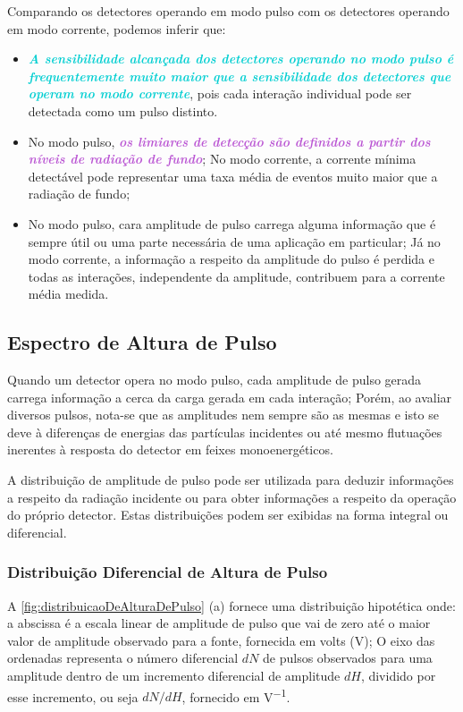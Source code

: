 \documentclass[11pt,a4paper]{article}
\begin{document}
			Comparando os detectores operando em modo pulso com os detectores operando em modo corrente, podemos inferir que:

			\begin{itemize}
				\item \textcolor{DarkTurquoise}{\textit{\textbf{A sensibilidade alcançada dos detectores operando no modo pulso é frequentemente muito maior que a sensibilidade dos detectores que operam no modo corrente}}}, pois cada interação individual pode ser detectada como um pulso distinto.
				\item No modo pulso, \textcolor{MediumOrchid}{\textit{\textbf{os limiares de detecção são definidos a partir dos níveis de radiação de fundo}}}; No modo corrente, a corrente mínima detectável pode representar uma taxa média de eventos muito maior que a radiação de fundo;
				\item No modo pulso, cara amplitude de pulso carrega alguma informação que é sempre útil ou uma parte necessária de uma aplicação em particular; Já no modo corrente, a informação a respeito da amplitude do pulso é perdida e todas as interações, independente da amplitude, contribuem para a corrente média medida. 
			\end{itemize}

	\subsection*{Espectro de Altura de Pulso}

		Quando um detector opera no modo pulso, cada amplitude de pulso gerada carrega informação a cerca da carga gerada em cada interação; Porém, ao avaliar diversos pulsos, nota-se que as amplitudes nem sempre são as mesmas e isto se deve à diferenças de energias das partículas incidentes ou até mesmo flutuações inerentes à resposta do detector em feixes monoenergéticos. 

		A distribuição de amplitude de pulso pode ser utilizada para deduzir informações a respeito da radiação incidente ou para obter informações a respeito da operação do próprio detector. Estas distribuições podem ser exibidas na forma integral ou diferencial.



		\subsubsection*{Distribuição Diferencial de Altura de Pulso}

			A  \ref{fig:distribuicaoDeAlturaDePulso} (a) fornece uma distribuição hipotética onde: a abscissa é a escala linear de amplitude de pulso que vai de zero até o maior valor de amplitude observado para a fonte, fornecida em volts (V); O eixo das ordenadas representa o número diferencial $dN$  de pulsos observados para uma amplitude dentro de um incremento diferencial de amplitude $dH$, dividido por esse incremento, ou seja $dN/dH$, fornecido em \unit{V^{-1}}.
\end{document}
